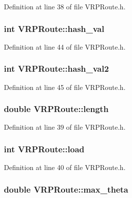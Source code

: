 Definition at line 38 of file VRPRoute.h.

\hypertarget{class_v_r_p_route_acae3211284130237208d1e5d4bf3bd06}{
\subsubsection[{hash\_\-val}]{\setlength{\rightskip}{0pt plus 5cm}int {\bf VRPRoute::hash\_\-val}}}
\label{class_v_r_p_route_acae3211284130237208d1e5d4bf3bd06}


Definition at line 44 of file VRPRoute.h.

\hypertarget{class_v_r_p_route_afce4f06d2abdd94d1d89e6ff8f768d42}{
\subsubsection[{hash\_\-val2}]{\setlength{\rightskip}{0pt plus 5cm}int {\bf VRPRoute::hash\_\-val2}}}
\label{class_v_r_p_route_afce4f06d2abdd94d1d89e6ff8f768d42}


Definition at line 45 of file VRPRoute.h.

\hypertarget{class_v_r_p_route_a1b2f5196b37c6e28ded11338719b24cc}{
\subsubsection[{length}]{\setlength{\rightskip}{0pt plus 5cm}double {\bf VRPRoute::length}}}
\label{class_v_r_p_route_a1b2f5196b37c6e28ded11338719b24cc}


Definition at line 39 of file VRPRoute.h.

\hypertarget{class_v_r_p_route_a193220e68b6e982d24b4f522138d92c1}{
\subsubsection[{load}]{\setlength{\rightskip}{0pt plus 5cm}int {\bf VRPRoute::load}}}
\label{class_v_r_p_route_a193220e68b6e982d24b4f522138d92c1}


Definition at line 40 of file VRPRoute.h.

\hypertarget{class_v_r_p_route_adae87753adb4e3a0d68b644e52ba5f13}{
\subsubsection[{max\_\-theta}]{\setlength{\rightskip}{0pt plus 5cm}double {\bf VRPRoute::max\_\-theta}}}
\label{class_v_r_p_route_adae87753adb4e3a0d68b644e52ba5f13}


